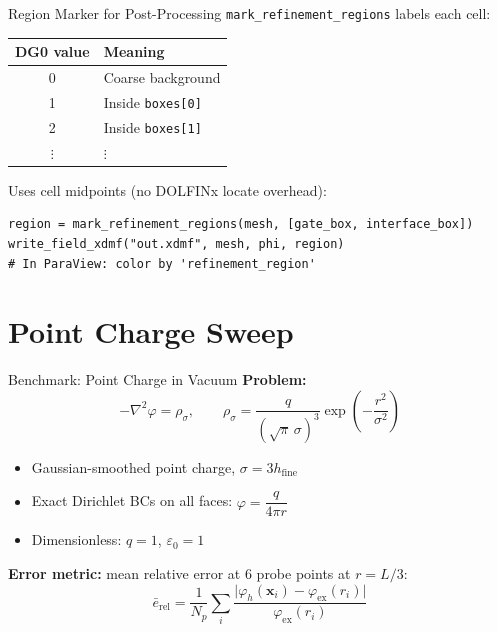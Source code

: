 \documentclass[aspectratio=169]{beamer}
\begin{document}
\begin{frame}[fragile]{Region Marker for Post-Processing}
  \texttt{mark\_refinement\_regions} labels each cell:

  \vspace{0.3em}
  \begin{center}
  \begin{tabular}{cl}
    \toprule
    DG0 value & Meaning \\
    \midrule
    0 & Coarse background \\
    1 & Inside \texttt{boxes[0]} \\
    2 & Inside \texttt{boxes[1]} \\
    $\vdots$ & $\vdots$ \\
    \bottomrule
  \end{tabular}
  \end{center}

  \vspace{0.5em}
  Uses cell midpoints (no DOLFINx locate overhead):
  \begin{lstlisting}[style=pysmall]
region = mark_refinement_regions(mesh, [gate_box, interface_box])
write_field_xdmf("out.xdmf", mesh, phi, region)
# In ParaView: color by 'refinement_region'
  \end{lstlisting}
\end{frame}

\section{Point Charge Sweep}

\begin{frame}{Benchmark: Point Charge in Vacuum}
  \textbf{Problem:}
  \[
    -\nabla^2 \varphi = \rho_\sigma, \qquad
    \rho_\sigma = \frac{q}{(\sqrt{\pi}\,\sigma)^3}
    \exp\!\left(-\frac{r^2}{\sigma^2}\right)
  \]

  \begin{itemize}
    \item Gaussian-smoothed point charge, $\sigma = 3 h_\text{fine}$
    \item Exact Dirichlet BCs on all faces: $\varphi = \dfrac{q}{4\pi r}$
    \item Dimensionless: $q = 1$, $\varepsilon_0 = 1$
  \end{itemize}

  \vspace{0.5em}
  \textbf{Error metric:} mean relative error at 6 probe points at $r = L/3$:
  \[
    \bar{e}_\text{rel} = \frac{1}{N_p}\sum_i
      \frac{\lvert \varphi_h(\mathbf{x}_i) - \varphi_\text{ex}(r_i)\rvert}
           {\varphi_\text{ex}(r_i)}
  \]
\end{frame}
\end{document}
